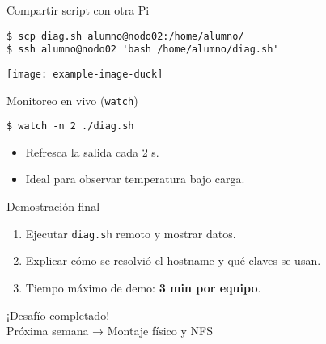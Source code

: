 \documentclass[aspectratio=169, professionalfonts]{beamer}
\begin{document}
\begin{frame}[fragile]{Compartir script con otra Pi}
\begin{verbatim}
$ scp diag.sh alumno@nodo02:/home/alumno/
$ ssh alumno@nodo02 'bash /home/alumno/diag.sh'
\end{verbatim}
\pause
\centering
\texttt{[image: example-image-duck]}
\end{frame}

\begin{frame}[fragile]{Monitoreo en vivo (\texttt{watch})}
\begin{verbatim}
$ watch -n 2 ./diag.sh
\end{verbatim}
\begin{itemize}
  \item Refresca la salida cada 2 s.  
  \item Ideal para observar temperatura bajo carga.  
\end{itemize}
\end{frame}

\begin{frame}{Demostración final}
\begin{enumerate}
  \item Ejecutar \texttt{diag.sh} remoto y mostrar datos.  
  \item Explicar cómo se resolvió el hostname y qué claves se usan.  
  \item Tiempo máximo de demo: \textbf{3 min por equipo}.  
\end{enumerate}
\end{frame}

\begin{frame}[fragile]
¡Desafío completado! 🎉\\
\small Próxima semana → Montaje físico y NFS
\end{frame}
\end{document}
